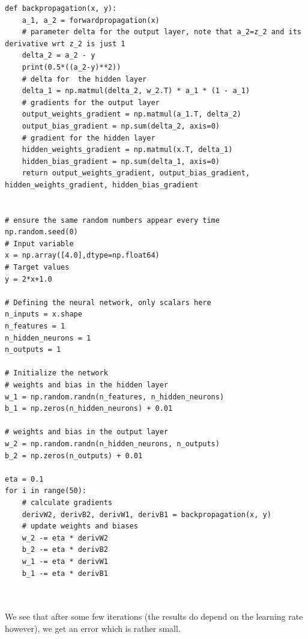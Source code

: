 \documentclass{beamer}
\begin{document}
\begin{frame}
\begin{verbatim}
def backpropagation(x, y):
    a_1, a_2 = forwardpropagation(x)
    # parameter delta for the output layer, note that a_2=z_2 and its derivative wrt z_2 is just 1
    delta_2 = a_2 - y
    print(0.5*((a_2-y)**2))
    # delta for  the hidden layer
    delta_1 = np.matmul(delta_2, w_2.T) * a_1 * (1 - a_1)
    # gradients for the output layer
    output_weights_gradient = np.matmul(a_1.T, delta_2)
    output_bias_gradient = np.sum(delta_2, axis=0)
    # gradient for the hidden layer
    hidden_weights_gradient = np.matmul(x.T, delta_1)
    hidden_bias_gradient = np.sum(delta_1, axis=0)
    return output_weights_gradient, output_bias_gradient, hidden_weights_gradient, hidden_bias_gradient


# ensure the same random numbers appear every time
np.random.seed(0)
# Input variable
x = np.array([4.0],dtype=np.float64)
# Target values
y = 2*x+1.0 

# Defining the neural network, only scalars here
n_inputs = x.shape
n_features = 1
n_hidden_neurons = 1
n_outputs = 1

# Initialize the network
# weights and bias in the hidden layer
w_1 = np.random.randn(n_features, n_hidden_neurons)
b_1 = np.zeros(n_hidden_neurons) + 0.01

# weights and bias in the output layer
w_2 = np.random.randn(n_hidden_neurons, n_outputs)
b_2 = np.zeros(n_outputs) + 0.01

eta = 0.1
for i in range(50):
    # calculate gradients
    derivW2, derivB2, derivW1, derivB1 = backpropagation(x, y)
    # update weights and biases
    w_2 -= eta * derivW2
    b_2 -= eta * derivB2
    w_1 -= eta * derivW1
    b_1 -= eta * derivB1



\end{verbatim}


We see that after some few iterations (the results do depend on the learning rate however), we get an error which is rather small.
\end{frame}
\end{document}
